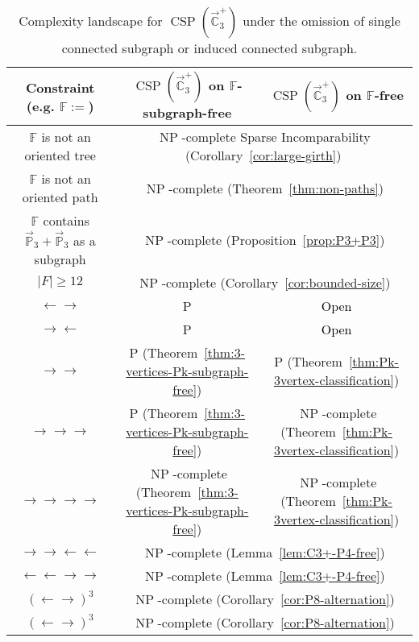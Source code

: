 \documentclass{article}
\theoremstyle{definition}
\theoremstyle{remark}
\newcommand{\blue}[1]{\textcolor{black}{#1}}
\DeclareMathOperator{\NP}{NP}
\DeclareMathOperator{\CSP}{CSP}
\newcommand{\bC}{{\mathbb C}}
\newcommand{\bF}{{\mathbb F}}
\newcommand{\bP}{{\mathbb P}}
\begin{document}
\begin{table}[ht!]
    \begin{center}
    \begin{tabular}{|c|c|c|}
\hline
Constraint (\mbox{e.g.} $\bF:=$)  & $\CSP(\vec{\bC}_3^+)$ on $\bF$-subgraph-free & $\CSP(\vec{\bC}_3^+)$ on $\bF$-free \\
\hline
$\bF$ is not an oriented tree & \multicolumn{2}{c|}{$\NP$-complete Sparse Incomparability (Corollary~\ref{cor:large-girth})} \\
 \hline 
$\bF$ is not an oriented path & \multicolumn{2}{c|}{$\NP$-complete (Theorem~\ref{thm:non-paths})} \\
\hline 
$\bF$ contains $\vec{\bP}_3+\vec{\bP}_3$ as a subgraph & \multicolumn{2}{c|}{$\NP$-complete (Proposition~\ref{prop:P3+P3})} \\
\hline
$|F|\ge 12$ & \multicolumn{2}{c|}{$\NP$-complete (Corollary~\ref{cor:bounded-size})} \\
\hline
$\leftarrow \rightarrow$ & P  \cite[Lemma 1]{HM14} & \blue{Open} \\
\hline
$\rightarrow \leftarrow$ & P  \cite[Lemma 1]{HM14} & \blue{Open} \\
\hline
$\rightarrow \rightarrow$ & P (Theorem~\ref{thm:3-vertices-Pk-subgraph-free}) & P (Theorem~\ref{thm:Pk-3vertex-classification})\\
\hline
$\rightarrow \rightarrow \rightarrow$ & P (Theorem~\ref{thm:3-vertices-Pk-subgraph-free}) & $\NP$-complete (Theorem~\ref{thm:Pk-3vertex-classification})\\
\hline
$\rightarrow \rightarrow \rightarrow \rightarrow $ & $\NP$-complete (Theorem~\ref{thm:3-vertices-Pk-subgraph-free}) & $\NP$-complete  (Theorem~\ref{thm:Pk-3vertex-classification})\\
\hline
$\rightarrow \rightarrow \leftarrow\leftarrow$ & \multicolumn{2}{c|}{$\NP$-complete (Lemma~\ref{lem:C3+-P4-free})} \\
\hline
$\leftarrow\leftarrow \rightarrow\rightarrow$ & \multicolumn{2}{c|}{$\NP$-complete (Lemma~\ref{lem:C3+-P4-free})}\\
\hline
$(\leftarrow \rightarrow)^3$ & \multicolumn{2}{c|}{$\NP$-complete (Corollary~\ref{cor:P8-alternation})}\\ 
\hline
$(\leftarrow \rightarrow)^3$ & \multicolumn{2}{c|}{$\NP$-complete (Corollary~\ref{cor:P8-alternation})} \\
\hline
    \end{tabular}
    \end{center}
    \caption{Complexity landscape for $\CSP(\vec{\bC}_3^+)$ under the omission of  single connected subgraph or induced connected subgraph.}
    \label{fig:landscape-C3+-omitting-subgraph}
\end{table}
\end{document}

